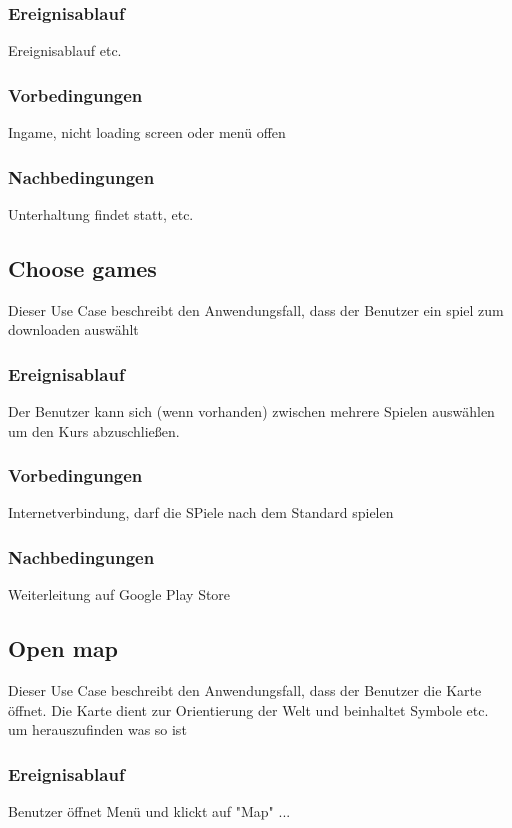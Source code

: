 		\subsubsection{Ereignisablauf}
			Ereignisablauf etc.

		\subsubsection{Vorbedingungen}
			Ingame, nicht loading screen oder menü offen
			
		\subsubsection{Nachbedingungen}
			Unterhaltung findet statt, etc.
	
	\subsection{Choose games}
		Dieser Use Case beschreibt den Anwendungsfall, dass der Benutzer ein spiel zum downloaden auswählt
			
		\subsubsection{Ereignisablauf}
			Der Benutzer kann sich (wenn vorhanden) zwischen mehrere Spielen auswählen um den Kurs abzuschließen.

		\subsubsection{Vorbedingungen}
			Internetverbindung, darf die SPiele nach dem Standard spielen
			
		\subsubsection{Nachbedingungen}
			Weiterleitung auf Google Play Store

	\subsection{Open map}
		Dieser Use Case beschreibt den Anwendungsfall, dass der Benutzer die Karte öffnet. Die Karte dient zur Orientierung der Welt und beinhaltet Symbole etc. um herauszufinden was so ist
			
		\subsubsection{Ereignisablauf}
			Benutzer öffnet Menü und klickt auf "Map" ...
	
